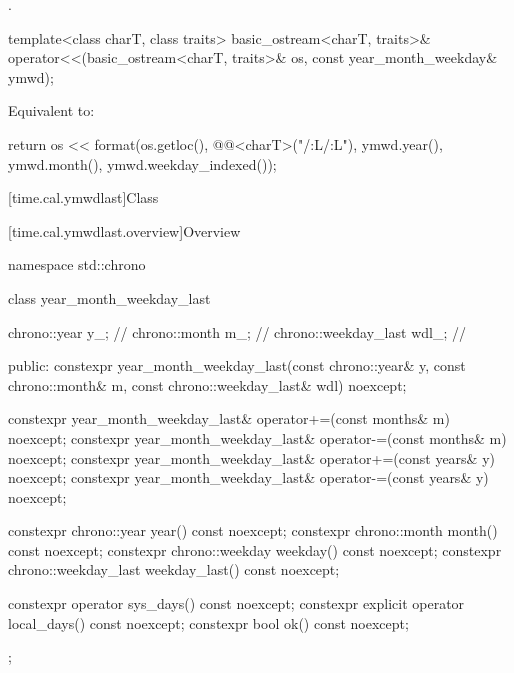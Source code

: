 \begin{itemdescr}
\pnum
\returns
{}.
\end{itemdescr}

%
\begin{itemdecl}
template<class charT, class traits>
  basic_ostream<charT, traits>&
    operator<<(basic_ostream<charT, traits>& os, const year_month_weekday& ymwd);
\end{itemdecl}

\begin{itemdescr}
\pnum
\effects
Equivalent to:
\begin{codeblock}
return os << format(os.getloc(), @@<charT>("{}/{:L}/{:L}"),
                    ymwd.year(), ymwd.month(), ymwd.weekday_indexed());
\end{codeblock}
\end{itemdescr}

[time.cal.ymwdlast]{Class }

[time.cal.ymwdlast.overview]{Overview}

\begin{codeblock}
namespace std::chrono {
  class year_month_weekday_last {
    chrono::year         y_;    // \expos
    chrono::month        m_;    // \expos
    chrono::weekday_last wdl_;  // \expos

  public:
    constexpr year_month_weekday_last(const chrono::year& y, const chrono::month& m,
                                      const chrono::weekday_last& wdl) noexcept;

    constexpr year_month_weekday_last& operator+=(const months& m) noexcept;
    constexpr year_month_weekday_last& operator-=(const months& m) noexcept;
    constexpr year_month_weekday_last& operator+=(const years& y)  noexcept;
    constexpr year_month_weekday_last& operator-=(const years& y)  noexcept;

    constexpr chrono::year         year()         const noexcept;
    constexpr chrono::month        month()        const noexcept;
    constexpr chrono::weekday      weekday()      const noexcept;
    constexpr chrono::weekday_last weekday_last() const noexcept;

    constexpr          operator sys_days()   const noexcept;
    constexpr explicit operator local_days() const noexcept;
    constexpr bool ok() const noexcept;
  };
}
\end{codeblock}

